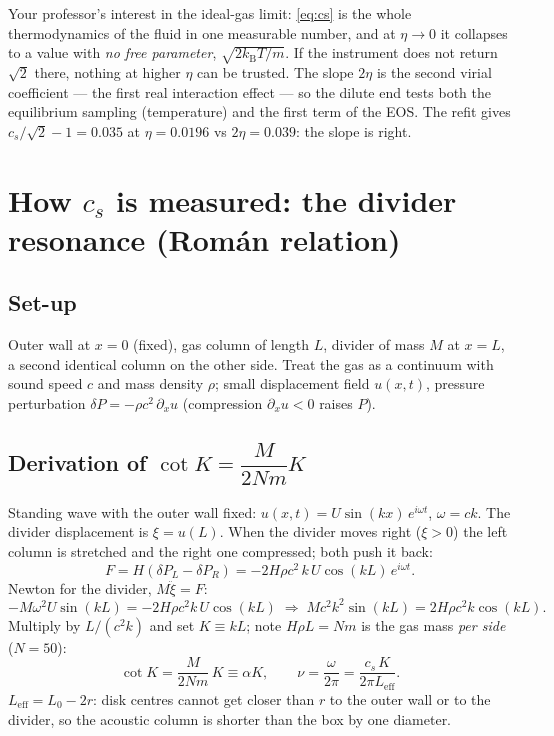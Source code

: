 \documentclass[11pt,a4paper]{article}
\newcommand{\kT}{k_{\mathrm B}T}
\begin{document}
\begin{why}
Your professor's interest in the ideal-gas limit: \eqref{eq:cs} is the whole thermodynamics of the fluid in one measurable number, and at $\eta\to0$ it collapses to a value with \emph{no free parameter}, $\sqrt{2\kT/m}$. If the instrument does not return $\sqrt2$ there, nothing at higher $\eta$ can be trusted. The slope $2\eta$ is the second virial coefficient --- the first real interaction effect --- so the dilute end tests both the equilibrium sampling (temperature) and the first term of the EOS. The refit gives $c_s/\sqrt2 - 1 = 0.035$ at $\eta = 0.0196$ vs $2\eta = 0.039$: the slope is right.
\end{why}

\section{How $c_s$ is measured: the divider resonance (Román relation)}

\subsection{Set-up}
Outer wall at $x = 0$ (fixed), gas column of length $L$, divider of mass $M$ at $x = L$, a second identical column on the other side. Treat the gas as a continuum with sound speed $c$ and mass density $\rho$; small displacement field $u(x,t)$, pressure perturbation $\delta P = -\rho c^2\,\partial_x u$ (compression $\partial_x u<0$ raises $P$).

\subsection{Derivation of \texorpdfstring{$\cot K = \dfrac{M}{2Nm}K$}{cot K = (M/2Nm) K}}
Standing wave with the outer wall fixed: $u(x,t) = U\sin(kx)\,e^{i\omega t}$, $\omega = ck$. The divider displacement is $\xi = u(L)$. When the divider moves right ($\xi>0$) the left column is stretched and the right one compressed; both push it back:
\begin{equation}
F = H\left(\delta P_L - \delta P_R\right) = -2H\rho c^2\,k\,U\cos(kL)\,e^{i\omega t}.
\end{equation}
Newton for the divider, $M\ddot\xi = F$:
\begin{equation}
-M\omega^2 U\sin(kL) = -2H\rho c^2 k\,U\cos(kL)
\;\Longrightarrow\;
M c^2k^2\sin(kL) = 2H\rho c^2 k\cos(kL).
\end{equation}
Multiply by $L/(c^2 k)$ and set $K \equiv kL$; note $H\rho L = Nm$ is the gas mass \emph{per side} ($N = 50$):
\begin{equation}
\boxed{\;\cot K = \frac{M}{2Nm}\,K \equiv \alpha K,\qquad \nu = \frac{\omega}{2\pi} = \frac{c_s\,K}{2\pi L_{\mathrm{eff}}}.\;}
\label{eq:roman}
\end{equation}
$L_{\mathrm{eff}} = L_0 - 2r$: disk centres cannot get closer than $r$ to the outer wall or to the divider, so the acoustic column is shorter than the box by one diameter.
\end{document}
